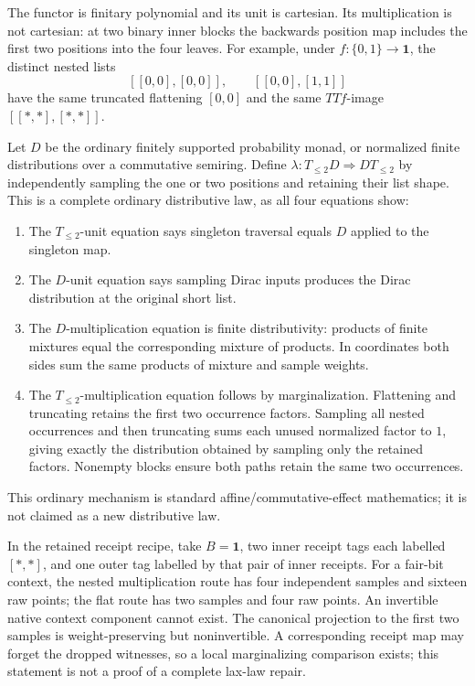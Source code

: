 \documentclass[11pt,a4paper]{article}
\theoremstyle{definition}
\newcommand{\one}{\mathbf 1}
\begin{document}
The functor is finitary polynomial and its unit is cartesian. Its
multiplication is not cartesian: at two binary inner blocks the backwards
position map includes the first two positions into the four leaves.
For example, under $f:\{0,1\}\to\one$, the distinct nested lists
\[
 [[0,0],[0,0]],\qquad [[0,0],[1,1]]
\]
have the same truncated flattening $[0,0]$ and the same $TTf$-image
$[[*,*],[*,*]]$.

Let $D$ be the ordinary finitely supported probability monad, or normalized
finite distributions over a commutative semiring. Define
$\lambda:T_{\le2}D\Rightarrow DT_{\le2}$ by independently sampling the
one or two positions and retaining their list shape. This is a complete
ordinary distributive law, as all four equations show:
\begin{enumerate}
\item The $T_{\le2}$-unit equation says singleton traversal equals
$D$ applied to the singleton map.
\item The $D$-unit equation says sampling Dirac inputs produces the
Dirac distribution at the original short list.
\item The $D$-multiplication equation is finite distributivity: products
of finite mixtures equal the corresponding mixture of products. In
coordinates both sides sum the same products of mixture and sample
weights.
\item The $T_{\le2}$-multiplication equation follows by marginalization.
Flattening and truncating retains the first two occurrence factors.
Sampling all nested occurrences and then truncating sums each unused
normalized factor to $1$, giving exactly the distribution obtained by
sampling only the retained factors. Nonempty blocks ensure both paths
retain the same two occurrences.
\end{enumerate}
This ordinary mechanism is standard affine/commutative-effect mathematics;
it is not claimed as a new distributive law.

In the retained receipt recipe, take $B=\one$, two inner receipt tags each
labelled $[*,*]$, and one outer tag labelled by that pair of inner receipts.
For a fair-bit context, the nested multiplication route has four independent
samples and sixteen raw points; the flat route has two samples and four
raw points. An invertible native context component cannot exist. The
canonical projection to the first two samples is weight-preserving but
noninvertible. A corresponding receipt map may forget the dropped
witnesses, so a local marginalizing comparison exists; this statement is
not a proof of a complete lax-law repair.
\end{document}
